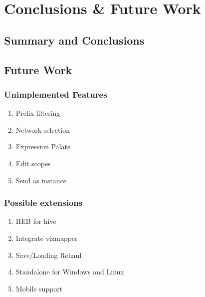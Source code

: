 \chapter{Conclusions \& Future Work}

\section{Summary and Conclusions}

\section{Future Work}
	\subsection{Unimplemented Features}
	\begin{enumerate}
		\item Prefix filtering
		\item Network selection
		\item Expression Palate 
		\item Edit scopes
		\item Send as instance
	\end{enumerate}
	\subsection{Possible extensions} %
	\label{sub:possible_extensions}
	\begin{enumerate}
		\item HEB for hive
		\item Integrate vizmapper
		\item Save/Loading Rehaul
		\item Standalone for Windows and Linux
		\item Mobile support
	\end{enumerate}
